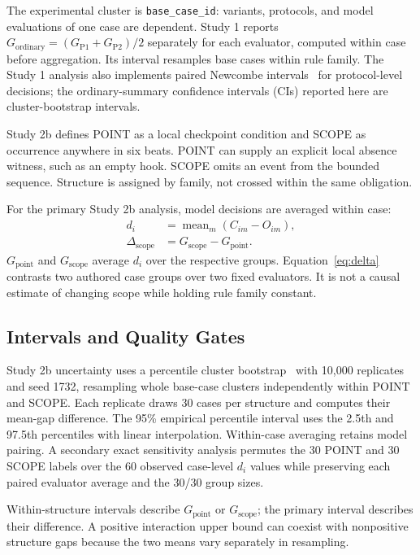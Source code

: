 \documentclass{ieeeaccess}
\newcommand{\code}[1]{\texttt{#1}}
\newcommand{\Gordinary}{G_{\mathrm{ordinary}}}
\newcommand{\Gpoint}{G_{\mathrm{point}}}
\newcommand{\Gscope}{G_{\mathrm{scope}}}
\newcommand{\Dscope}{\Delta_{\mathrm{scope}}}
\begin{document}
The experimental cluster is \code{base\_case\_id}: variants, protocols, and model evaluations of one case are dependent. Study 1 reports $\Gordinary=(G_{\mathrm{P1}}+G_{\mathrm{P2}})/2$ separately for each evaluator, computed within case before aggregation. Its interval resamples base cases within rule family. The Study 1 analysis also implements paired Newcombe intervals~\cite{newcombe1998paired} for protocol-level decisions; the ordinary-summary confidence intervals (CIs) reported here are cluster-bootstrap intervals.

Study 2b defines POINT as a local checkpoint condition and SCOPE as occurrence anywhere in six beats. POINT can supply an explicit local absence witness, such as an empty hook. SCOPE omits an event from the bounded sequence. Structure is assigned by family, not crossed within the same obligation.

For the primary Study 2b analysis, model decisions are averaged within case:
\begin{equation}
\begin{aligned}
d_i&=\operatorname{mean}_m(C_{im}-O_{im}),\\
\Dscope&=\Gscope-\Gpoint.
\end{aligned}
\label{eq:delta}
\end{equation}
$\Gpoint$ and $\Gscope$ average $d_i$ over the respective groups. Equation~\eqref{eq:delta} contrasts two authored case groups over two fixed evaluators. It is not a causal estimate of changing scope while holding rule family constant.

\subsection{Intervals and Quality Gates}
Study 2b uncertainty uses a percentile cluster bootstrap~\cite{field2007bootstrap} with 10,000 replicates and seed 1732, resampling whole base-case clusters independently within POINT and SCOPE. Each replicate draws 30 cases per structure and computes their mean-gap difference. The 95\% empirical percentile interval uses the 2.5th and 97.5th percentiles with linear interpolation. Within-case averaging retains model pairing. A secondary exact sensitivity analysis permutes the 30 POINT and 30 SCOPE labels over the 60 observed case-level $d_i$ values while preserving each paired evaluator average and the 30/30 group sizes.

Within-structure intervals describe $\Gpoint$ or $\Gscope$; the primary interval describes their difference. A positive interaction upper bound can coexist with nonpositive structure gaps because the two means vary separately in resampling.
\end{document}
